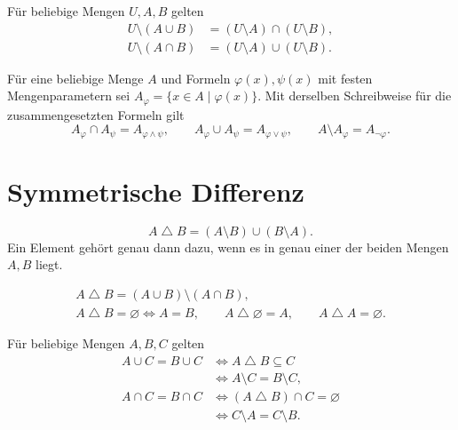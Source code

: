 \begin{theorem}
Für beliebige Mengen $U,A,B$ gelten
\[
\begin{aligned}
 U\setminus(A\cup B)&=(U\setminus A)\cap(U\setminus B),\\
 U\setminus(A\cap B)&=(U\setminus A)\cup(U\setminus B).
\end{aligned}
\]
\end{theorem}

\begin{theorem}
Für eine beliebige Menge $A$ und Formeln $\varphi(x),\psi(x)$
mit festen Mengenparametern sei
$A_\varphi=\{x\in A\mid\varphi(x)\}$.
Mit derselben Schreibweise für die zusammengesetzten Formeln gilt
\[
 A_\varphi\cap A_\psi=A_{\varphi\land\psi},\qquad
 A_\varphi\cup A_\psi=A_{\varphi\lor\psi},\qquad
 A\setminus A_\varphi=A_{\neg\varphi}.
\]
\end{theorem}

\section{Symmetrische Differenz}

\begin{definition}
\[
 A\mathbin{\triangle}B=(A\setminus B)\cup(B\setminus A).
\]
Ein Element gehört genau dann dazu, wenn es in genau einer der
beiden Mengen $A,B$ liegt.
\end{definition}

\begin{theorem}
\[
\begin{gathered}
 A\mathbin{\triangle}B=(A\cup B)\setminus(A\cap B),\\
 A\mathbin{\triangle}B=\varnothing\Longleftrightarrow A=B,\qquad
 A\mathbin{\triangle}\varnothing=A,\qquad
 A\mathbin{\triangle}A=\varnothing.
\end{gathered}
\]
\end{theorem}

\begin{theorem}
Für beliebige Mengen $A,B,C$ gelten
\[
\begin{aligned}
 A\cup C=B\cup C
   &\Longleftrightarrow A\mathbin{\triangle}B\subseteq C\\
   &\Longleftrightarrow A\setminus C=B\setminus C,\\[.5em]
 A\cap C=B\cap C
   &\Longleftrightarrow (A\mathbin{\triangle}B)\cap C=\varnothing\\
   &\Longleftrightarrow C\setminus A=C\setminus B.
\end{aligned}
\]
\end{theorem}

